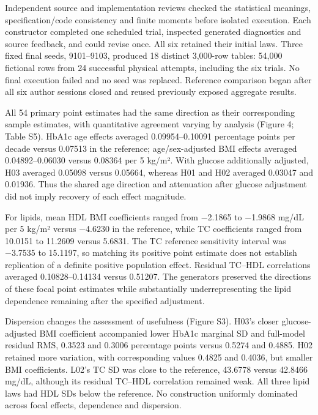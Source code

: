 \documentclass[sigconf,review]{acmart}
\begin{document}
Independent source and implementation reviews checked the statistical meanings, specification/\allowbreak{}code consistency and finite moments before isolated execution. Each constructor completed one scheduled trial, inspected generated diagnostics and source feedback, and could revise once. All six retained their initial laws. Three fixed final seeds, 9101–\allowbreak{}9103, produced 18 distinct 3,000-row tables: 54,000 fictional rows from 24 successful physical attempts, including the six trials. No final execution failed and no seed was replaced. Reference comparison began after all six author sessions closed and reused previously exposed aggregate results.


All 54 primary point estimates had the same direction as their corresponding sample estimates, with quantitative agreement varying by analysis (Figure 4; Table S5). HbA1c age effects averaged 0.09954–\allowbreak{}0.10091 percentage points per decade versus 0.07513 in the reference; age/\allowbreak{}sex-adjusted BMI effects averaged 0.04892–\allowbreak{}0.06030 versus 0.08364 per 5 kg/\allowbreak{}m². With glucose additionally adjusted, H03 averaged 0.05098 versus 0.05664, whereas H01 and H02 averaged 0.03047 and 0.01936. Thus the shared age direction and attenuation after glucose adjustment did not imply recovery of each effect magnitude.


For lipids, mean HDL BMI coefficients ranged from −2.1865 to −1.9868 mg/\allowbreak{}dL per 5 kg/\allowbreak{}m² versus −4.6230 in the reference, while TC coefficients ranged from 10.0151 to 11.2609 versus 5.6831. The TC reference sensitivity interval was −3.7535 to 15.1197, so matching its positive point estimate does not establish replication of a definite positive population effect. Residual TC–\allowbreak{}HDL correlations averaged 0.10828–\allowbreak{}0.14134 versus 0.51207. The generators preserved the directions of these focal point estimates while substantially underrepresenting the lipid dependence remaining after the specified adjustment.


Dispersion changes the assessment of usefulness (Figure S3). H03's closer glucose-adjusted BMI coefficient accompanied lower HbA1c marginal SD and full-model residual RMS, 0.3523 and 0.3006 percentage points versus 0.5274 and 0.4885. H02 retained more variation, with corresponding values 0.4825 and 0.4036, but smaller BMI coefficients. L02's TC SD was close to the reference, 43.6778 versus 42.8466 mg/\allowbreak{}dL, although its residual TC–\allowbreak{}HDL correlation remained weak. All three lipid laws had HDL SDs below the reference. No construction uniformly dominated across focal effects, dependence and dispersion.
\end{document}
